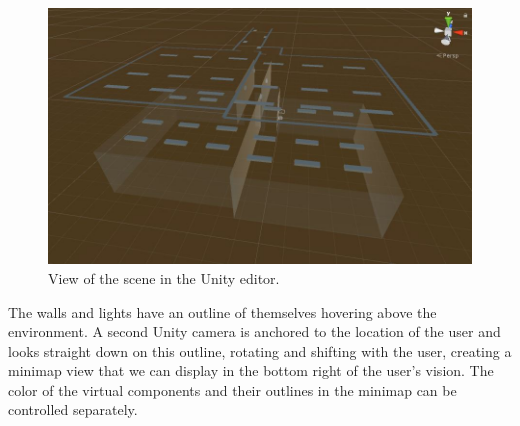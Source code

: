 \begin{figure}
    \centering
    \includegraphics[width=0.8\linewidth]{resources/implementation/model.jpg}
    \caption{View of the scene in the Unity editor.}
    \label{fig:model}
\end{figure}

The walls and lights have an outline of themselves hovering above the environment. A second Unity camera is anchored to the location of the user and looks straight down on this outline, rotating and shifting with the user, creating a minimap view that we can display in the bottom right of the user's vision. The color of the virtual components and their outlines in the minimap can be controlled separately.
